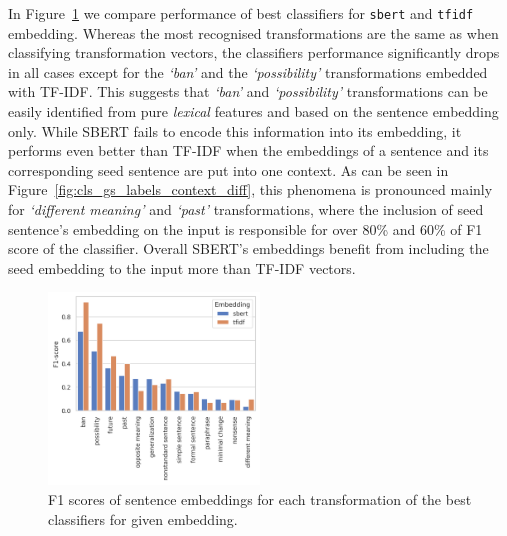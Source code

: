 \documentclass[11pt]{article}
\newcommand{\Embed}[1]{\texttt{#1}}
\newcommand{\Trans}[1]{\textsl{`#1'}}
\begin{document}
In Figure~\ref{fig:cls_gs_no_context_labels} we compare performance of best
classifiers for \Embed{sbert} and \Embed{tfidf} embedding. Whereas the most
recognised transformations are the same as when classifying transformation
vectors, the classifiers performance significantly drops in all cases except
for the \Trans{ban} and the \Trans{possibility} transformations embedded with
TF-IDF. This suggests that \Trans{ban} and \Trans{possibility} transformations
can be easily identified from pure \emph{lexical} features and based on the
sentence embedding only. While SBERT fails to encode this information into its
embedding, it performs even better than TF-IDF when the embeddings of a
sentence and its corresponding seed sentence are put into one context. As can
be seen in Figure~\ref{fig:cls_gs_labels_context_diff}, this phenomena is
pronounced mainly for \Trans{different meaning} and \Trans{past}
transformations, where the inclusion of seed sentence's embedding on the input
is responsible for over 80\% and 60\% of F1 score of the classifier. Overall
SBERT's embeddings benefit from including the seed embedding to the input more
than TF-IDF vectors.

\begin{figure}[htp]
  \centering
  \includegraphics[width=0.5\textwidth]{figs/cls_gs_no_context_labels.png}

  \caption{F1 scores of sentence embeddings for each transformation of the best
  classifiers for given embedding.}\label{fig:cls_gs_no_context_labels}

\end{figure}
\end{document}

